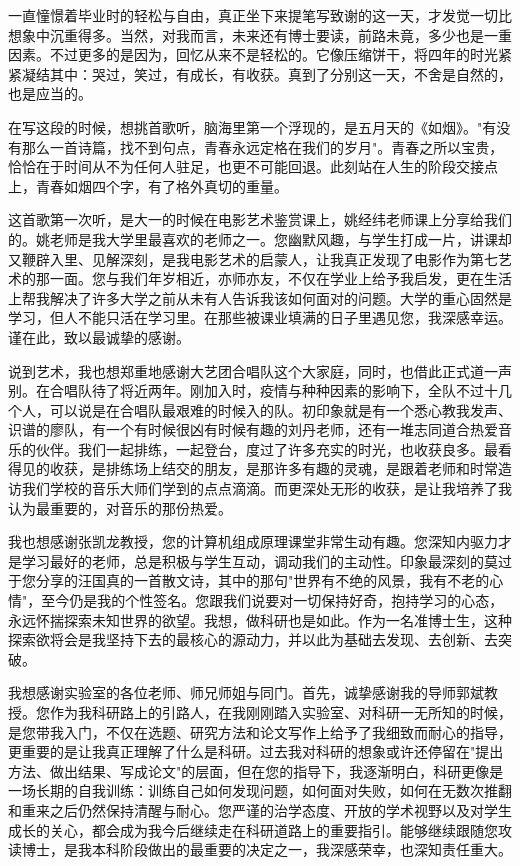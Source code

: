 
\begin{acknowledgements}
一直憧憬着毕业时的轻松与自由，真正坐下来提笔写致谢的这一天，才发觉一切比想象中沉重得多。当然，对我而言，未来还有博士要读，前路未竟，多少也是一重因素。不过更多的是因为，回忆从来不是轻松的。它像压缩饼干，将四年的时光紧紧凝结其中：哭过，笑过，有成长，有收获。真到了分别这一天，不舍是自然的，也是应当的。

在写这段的时候，想挑首歌听，脑海里第一个浮现的，是五月天的《如烟》。"有没有那么一首诗篇，找不到句点，青春永远定格在我们的岁月"。青春之所以宝贵，恰恰在于时间从不为任何人驻足，也更不可能回退。此刻站在人生的阶段交接点上，青春如烟四个字，有了格外真切的重量。

这首歌第一次听，是大一的时候在电影艺术鉴赏课上，姚经纬老师课上分享给我们的。姚老师是我大学里最喜欢的老师之一。您幽默风趣，与学生打成一片，讲课却又鞭辟入里、见解深刻，是我电影艺术的启蒙人，让我真正发现了电影作为第七艺术的那一面。您与我们年岁相近，亦师亦友，不仅在学业上给予我启发，更在生活上帮我解决了许多大学之前从未有人告诉我该如何面对的问题。大学的重心固然是学习，但人不能只活在学习里。在那些被课业填满的日子里遇见您，我深感幸运。谨在此，致以最诚挚的感谢。

说到艺术，我也想郑重地感谢大艺团合唱队这个大家庭，同时，也借此正式道一声别。在合唱队待了将近两年。刚加入时，疫情与种种因素的影响下，全队不过十几个人，可以说是在合唱队最艰难的时候入的队。初印象就是有一个悉心教我发声、识谱的廖队，有一个有时候很凶有时候有趣的刘丹老师，还有一堆志同道合热爱音乐的伙伴。我们一起排练，一起登台，度过了许多充实的时光，也收获良多。最看得见的收获，是排练场上结交的朋友，是那许多有趣的灵魂，是跟着老师和时常造访我们学校的音乐大师们学到的点点滴滴。而更深处无形的收获，是让我培养了我认为最重要的，对音乐的那份热爱。

我也想感谢张凯龙教授，您的计算机组成原理课堂非常生动有趣。您深知内驱力才是学习最好的老师，总是积极与学生互动，调动我们的主动性。印象最深刻的莫过于您分享的汪国真的一首散文诗，其中的那句"世界有不绝的风景，我有不老的心情"，至今仍是我的个性签名。您跟我们说要对一切保持好奇，抱持学习的心态，永远怀揣探索未知世界的欲望。我想，做科研也是如此。作为一名准博士生，这种探索欲将会是我坚持下去的最核心的源动力，并以此为基础去发现、去创新、去突破。

我想感谢实验室的各位老师、师兄师姐与同门。首先，诚挚感谢我的导师郭斌教授。您作为我科研路上的引路人，在我刚刚踏入实验室、对科研一无所知的时候，是您带我入门，不仅在选题、研究方法和论文写作上给予了我细致而耐心的指导，更重要的是让我真正理解了什么是科研。过去我对科研的想象或许还停留在"提出方法、做出结果、写成论文"的层面，但在您的指导下，我逐渐明白，科研更像是一场长期的自我训练：训练自己如何发现问题，如何面对失败，如何在无数次推翻和重来之后仍然保持清醒与耐心。您严谨的治学态度、开放的学术视野以及对学生成长的关心，都会成为我今后继续走在科研道路上的重要指引。能够继续跟随您攻读博士，是我本科阶段做出的最重要的决定之一，我深感荣幸，也深知责任重大。


\end{acknowledgements}
